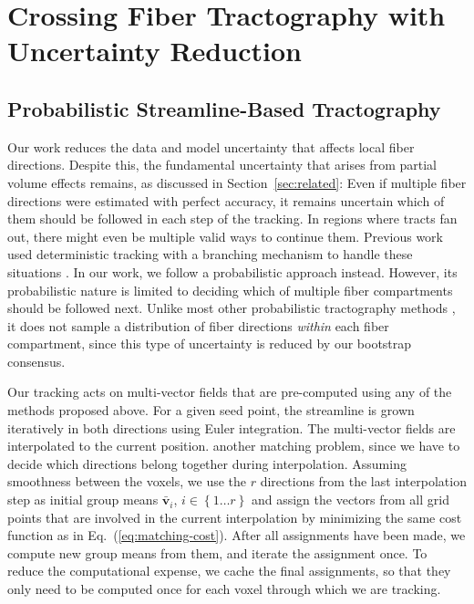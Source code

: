 \section{Crossing Fiber Tractography with Uncertainty Reduction}
\label{sec:tracking}
\subsection{Probabilistic Streamline-Based Tractography}
\label{sec:tracking-details}

Our work reduces the data and model uncertainty that affects local fiber directions. Despite this, the fundamental uncertainty that arises from partial volume effects remains, as discussed in Section~\ref{sec:related}: Even if multiple fiber directions were estimated with perfect accuracy, it remains  uncertain which of them should be followed in each step of the tracking. In regions where tracts fan out, there might even be multiple valid ways to continue them. Previous work used deterministic tracking with a branching mechanism to handle these situations \cite{Ankele:CARS2017}. In our work, we follow a probabilistic approach instead. However, its probabilistic nature is limited to deciding which of multiple fiber compartments should be followed next. Unlike most other probabilistic tractography methods \cite{BEHRENS2007144,Jones:2008}, it does not sample a distribution of fiber directions \emph{within} each fiber compartment, since this type of uncertainty is reduced by our bootstrap consensus.

Our tracking acts on multi-vector fields that are pre-computed using any of the methods proposed above. For a given seed point, the streamline is grown iteratively in both directions using Euler
integration. The multi-vector fields are interpolated to the current position.  another matching problem, since we have to decide which
directions belong together during interpolation. Assuming
smoothness between the voxels, we use the $r$ directions from the last
interpolation step as initial group means $\bar{\mathbf{v}}_i$, $i \in \left\{ 1\dots r 
\right\}$ and assign the vectors from all grid points that are involved in the current interpolation by minimizing the same cost function as in Eq.~(\ref{eq:matching-cost}).  After all assignments have been made, we   compute new group means from them, and iterate the assignment once. To reduce the computational expense, we cache the final assignments, so that they only need to be computed once for each voxel through which we are tracking.

